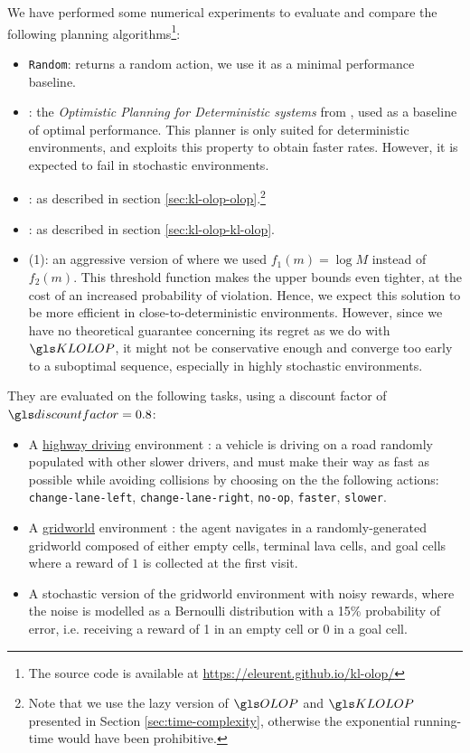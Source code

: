 We have performed some numerical experiments to evaluate and compare the following planning algorithms\footnote[1]{The source code is available at \url{https://eleurent.github.io/kl-olop/}}:
\begin{itemize}
	\item \texttt{Random}: returns a random action, we use it as a minimal performance baseline.
	\item \OPD: the \emph{Optimistic Planning for Deterministic systems} from \citep{Hren2008}, used as a baseline of optimal performance. This planner is only suited for deterministic environments, and exploits this property to obtain faster rates. However, it is expected to fail in stochastic environments.
	\item \OLOP: as described in section \ref{sec:kl-olop-olop}.\footnote[2]{Note that we use the lazy version of $\OLOP$ and $\KLOLOP$ presented in Section \ref{sec:time-complexity}, otherwise the exponential running-time would have been prohibitive.}
	\item \KLOLOP: as described in section \ref{sec:kl-olop-kl-olop}.\footnotemark[2]
	\item \KLOLOP(1): an aggressive version of \KLOLOP where we used $f_1(m) = \log M$ instead of $f_2(m)$. This threshold function makes the upper bounds even tighter, at the cost of an increased probability of violation. Hence, we expect this solution to be more efficient in close-to-deterministic environments. However, since we have no theoretical guarantee concerning its regret as we do with $\KLOLOP$, it might not be conservative enough and converge too early to a suboptimal sequence, especially in highly stochastic environments.
\end{itemize}

They are evaluated on the following tasks, using a discount factor of $\discount=0.8$:
\begin{itemize}
	\item A \href{https://github.com/eleurent/highway-env/}{highway driving} environment \citep{highway-env}: a vehicle is driving on a road randomly populated with other slower drivers, and must make their way as fast as possible while avoiding collisions by choosing on the the following actions: \texttt{change-lane-left}, \texttt{change-lane-right}, \texttt{no-op}, \texttt{faster}, \texttt{slower}.
	\item A \href{https://github.com/maximecb/gym-minigrid}{gridworld} environment \citep{gym_minigrid}: the agent navigates in a randomly-generated gridworld composed of either empty cells, terminal lava cells, and goal cells where a reward of $1$ is collected at the first visit.
	\item A stochastic version of the gridworld environment with noisy rewards, where the noise is modelled as a Bernoulli distribution with a 15\% probability of error, i.e. receiving a reward of 1 in an empty cell or 0 in a goal cell.
\end{itemize}

